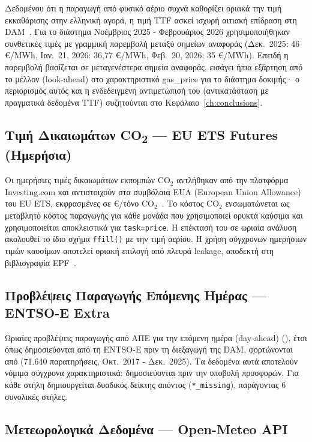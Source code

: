 Δεδομένου ότι η παραγωγή από φυσικό αέριο συχνά καθορίζει οριακά την τιμή εκκαθάρισης
στην ελληνική αγορά, η τιμή TTF ασκεί ισχυρή αιτιακή επίδραση στη DAM~\cite{lago2021}.
Για το διάστημα Νοέμβριος 2025 - Φεβρουάριος 2026 χρησιμοποιήθηκαν συνθετικές τιμές
με γραμμική παρεμβολή μεταξύ σημείων αναφοράς (Δεκ.\ 2025: 46 €/MWh, Ιαν.\ 21, 2026:
36,77 €/MWh, Φεβ.\ 20, 2026: 35 €/MWh). Επειδή η παρεμβολή βασίζεται σε
μεταγενέστερα σημεία αναφοράς, εισάγει ήπια εξάρτηση από το μέλλον (look-ahead)
στο χαρακτηριστικό gas\_price για το διάστημα δοκιμής· ο περιορισμός αυτός και η
ενδεδειγμένη αντιμετώπισή του (αντικατάσταση με πραγματικά δεδομένα TTF)
συζητούνται στο Κεφάλαιο~\ref{ch:conclusions}.


\subsection{Τιμή Δικαιωμάτων CO\textsubscript{2} — EU ETS Futures (Ημερήσια)}

Οι ημερήσιες τιμές δικαιωμάτων εκπομπών CO$_2$ αντλήθηκαν από την πλατφόρμα
Investing.com και αντιστοιχούν στα συμβόλαια EUA (European Union Allowance) του EU
ETS, εκφρασμένες σε €/τόνο CO$_2$~\cite{co2_ets}. Το κόστος CO$_2$ ενσωματώνεται ως
μεταβλητό κόστος παραγωγής για κάθε μονάδα που χρησιμοποιεί ορυκτά καύσιμα και
χρησιμοποιείται αποκλειστικά για \texttt{task=price}. Η επέκτασή του σε ωριαία ανάλυση
ακολουθεί το ίδιο σχήμα \texttt{ffill()} με την τιμή αερίου. Η χρήση σύγχρονων ημερήσιων
τιμών καυσίμων αποτελεί οριακή επιλογή από πλευρά leakage, αποδεκτή στη βιβλιογραφία
EPF~\cite{lago2021}.


\subsection{Προβλέψεις Παραγωγής Επόμενης Ημέρας — ENTSO-E Extra}

Ωριαίες προβλέψεις παραγωγής από ΑΠΕ για την επόμενη ημέρα (day-ahead) (), έτσι
όπως δημοσιεύονται από τη ENTSO-E πριν τη διεξαγωγή της DAM, φορτώνονται από
 (71.640 παρατηρήσεις,
Οκτ.\ 2017 - Δεκ.\ 2025). Τα δεδομένα αυτά αποτελούν νόμιμα σύγχρονα χαρακτηριστικά:
δημοσιεύονται πριν την υποβολή προσφορών. Για κάθε στήλη δημιουργείται δυαδικός δείκτης
απόντος (\texttt{*\_missing}), παράγοντας 6 συνολικές στήλες.


\subsection{Μετεωρολογικά Δεδομένα — Open-Meteo API}

